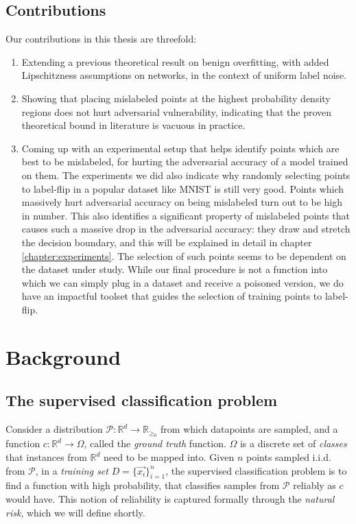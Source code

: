 \documentclass{ociamthesis}
\begin{document}
\section{Contributions}
Our contributions in this thesis are threefold:
\begin{enumerate}
    \item Extending a previous theoretical result on benign overfitting, with
    added Lipschitzness assumptions on networks, in the context of uniform label
    noise.
    \item Showing that placing mislabeled points at the highest probability
    density regions does not hurt adversarial vulnerability, indicating that the
    proven theoretical bound in literature is vacuous in practice.
    \item Coming up with an experimental setup that helps identify points which
    are best to be mislabeled, for hurting the adversarial accuracy of a model
    trained on them. The experiments we did also indicate why randomly selecting
    points to label-flip in a popular dataset like MNIST is still very good.
    Points which massively hurt adversarial accuracy on being mislabeled turn
    out to be high in number. This also identifies a significant property of
    mislabeled points that causes such a massive drop in the adversarial
    accuracy: they draw and stretch the decision boundary, and this will be
    explained in detail in chapter \ref{chapter:experiments}. The selection of
    such points seems to be dependent on the dataset under study. While our
    final procedure is not a function into which we can simply plug in a dataset
    and receive a poisoned version, we do have an impactful toolset that guides
    the selection of training points to label-flip.
\end{enumerate}


\chapter{Background}
\section{The supervised classification problem}

Consider a distribution $\mathcal{P}: \mathbb{R}^d \to \mathbb{R}_{\geq_0}$ from
which datapoints are sampled, and a function $c: \mathbb{R}^d \to \Omega$,
called the \emph{ground truth} function. $\Omega$ is a discrete set of
\emph{classes} that instances from $\mathbb{R}^d$ need to be mapped into. Given
$n$ points sampled i.i.d. from $\mathcal{P}$, in a \emph{training set}
$D=\{\vec{x_i}\}_{i=1}^{n}$, the supervised classification problem is to find a
function with high probability, that classifies samples from $\mathcal{P}$
reliably as $c$ would have. This notion of reliability is captured formally
through the \emph{natural risk}, which we will define shortly.
\end{document}
